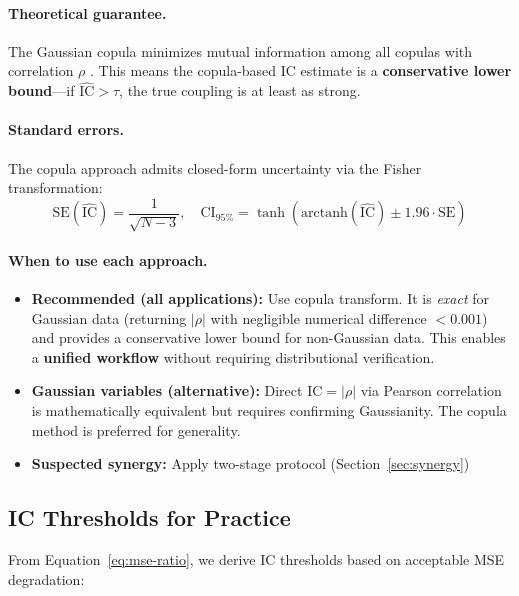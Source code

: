 \documentclass[10pt]{article} %
\theoremstyle{plain}
\theoremstyle{definition}
\newcommand{\IC}{\mathrm{IC}}  %
\begin{document}
\paragraph{Theoretical guarantee.} The Gaussian copula minimizes mutual information among all copulas with correlation $\rho$ \citep{joe1989estimation}. This means the copula-based IC estimate is a \textbf{conservative lower bound}---if $\widehat{\IC} > \tau$, the true coupling is at least as strong.

\paragraph{Standard errors.} The copula approach admits closed-form uncertainty via the Fisher transformation:
\begin{equation}
\text{SE}(\widehat{\IC}) = \frac{1}{\sqrt{N-3}}, \quad \text{CI}_{95\%} = \tanh\left(\text{arctanh}(\widehat{\IC}) \pm 1.96 \cdot \text{SE}\right)
\end{equation}

\paragraph{When to use each approach.}
\begin{itemize}[nosep]
    \item \textbf{Recommended (all applications):} Use copula transform. It is \emph{exact} for Gaussian data (returning $|\rho|$ with negligible numerical difference $<0.001$) and provides a conservative lower bound for non-Gaussian data. This enables a \textbf{unified workflow} without requiring distributional verification.
    \item \textbf{Gaussian variables (alternative):} Direct $\IC = |\rho|$ via Pearson correlation is mathematically equivalent but requires confirming Gaussianity. The copula method is preferred for generality.
    \item \textbf{Suspected synergy:} Apply two-stage protocol (Section~\ref{sec:synergy})
\end{itemize}

\subsection{IC Thresholds for Practice}
\label{sec:thresholds}

From Equation~\ref{eq:mse-ratio}, we derive IC thresholds based on acceptable MSE degradation:
\end{document}
